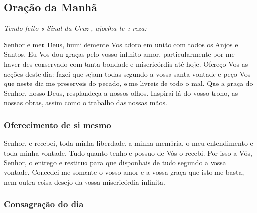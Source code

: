 \subsection{Oração da Manhã}\label{oracaomanha}

\emph{Tendo feito o Sinal da Cruz \cruz, ajoelha-te e reza:}

 Senhor e meu Deus, humildemente Vos adoro em união com todos os Anjos e Santos. Eu Vos dou graças pelo vosso infinito amor, particularmente por me haver-des conservado com tanta bondade e misericórdia até hoje. Ofereço-Vos as acções deste dia: fazei que sejam todas segundo a vossa santa vontade e peço-Vos que neste dia me preserveis do pecado, e me livreis de todo o mal. Que a graça do Senhor, nosso Deus, resplandeça a nossos olhos. Inspirai lá do vosso trono, as nossas obras, assim como o trabalho das nossas mãos.


\subsubsection{Oferecimento de si mesmo}\label{oferecimento}

 Senhor, e recebei, toda minha liberdade, a minha memória, o meu entendimento e toda minha vontade. Tudo quanto tenho e possuo de Vós o recebi. Por isso a Vós, Senhor, o entrego e restituo para que disponhais de tudo segundo a vossa vontade. Concedei-me somente o vosso amor e a vossa graça que isto me basta, nem outra coisa desejo da vossa misericórdia infinita.

\subsubsection{Consagração do dia}\label{consagracaodia}

\begin{paracol}{2}\switchcolumn{}\end{paracol}

